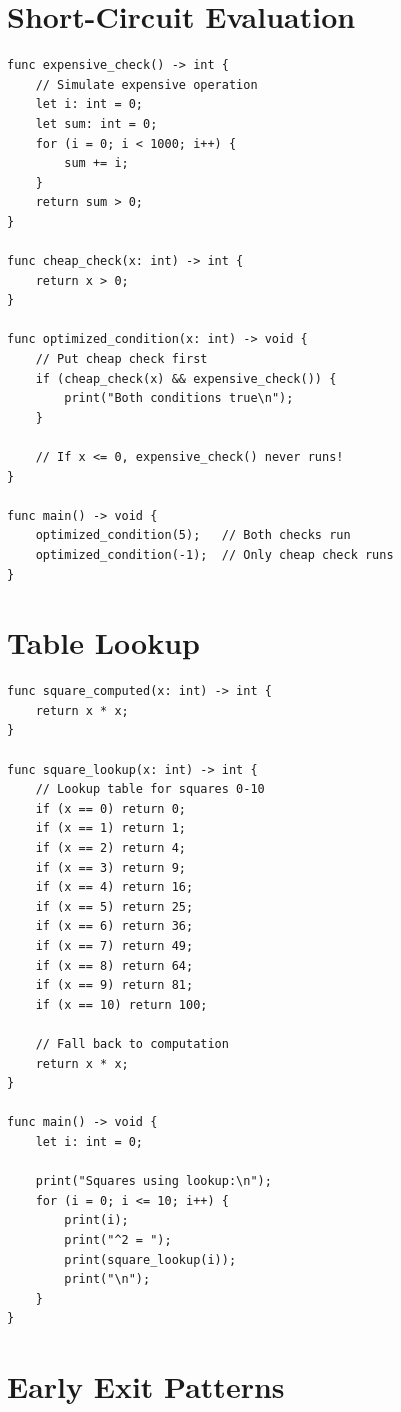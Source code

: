 \documentclass[12pt,a4paper,oneside]{book}
\begin{document}
\section{Short-Circuit Evaluation}

\begin{lstlisting}[style=algo, caption={Efficient Conditionals}]
func expensive_check() -> int {
    // Simulate expensive operation
    let i: int = 0;
    let sum: int = 0;
    for (i = 0; i < 1000; i++) {
        sum += i;
    }
    return sum > 0;
}

func cheap_check(x: int) -> int {
    return x > 0;
}

func optimized_condition(x: int) -> void {
    // Put cheap check first
    if (cheap_check(x) && expensive_check()) {
        print("Both conditions true\n");
    }
    
    // If x <= 0, expensive_check() never runs!
}

func main() -> void {
    optimized_condition(5);   // Both checks run
    optimized_condition(-1);  // Only cheap check runs
}
\end{lstlisting}

\section{Table Lookup}

\begin{lstlisting}[style=algo, caption={Precomputed Values}]
func square_computed(x: int) -> int {
    return x * x;
}

func square_lookup(x: int) -> int {
    // Lookup table for squares 0-10
    if (x == 0) return 0;
    if (x == 1) return 1;
    if (x == 2) return 4;
    if (x == 3) return 9;
    if (x == 4) return 16;
    if (x == 5) return 25;
    if (x == 6) return 36;
    if (x == 7) return 49;
    if (x == 8) return 64;
    if (x == 9) return 81;
    if (x == 10) return 100;
    
    // Fall back to computation
    return x * x;
}

func main() -> void {
    let i: int = 0;
    
    print("Squares using lookup:\n");
    for (i = 0; i <= 10; i++) {
        print(i);
        print("^2 = ");
        print(square_lookup(i));
        print("\n");
    }
}
\end{lstlisting}

\section{Early Exit Patterns}
\end{document}
